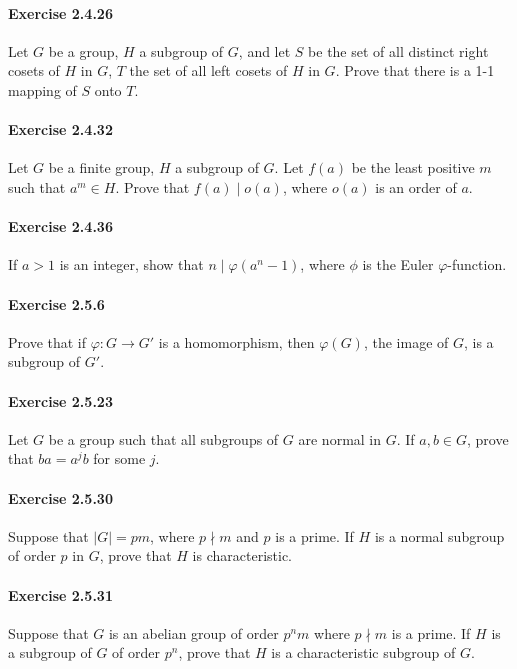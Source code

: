 \documentclass{article}
\begin{document}
\paragraph{Exercise 2.4.26} Let $G$ be a group, $H$ a subgroup of $G$, and let $S$ be the set of all distinct right cosets of $H$ in $G$, $T$ the set of all left cosets of $H$ in $G$. Prove that there is a 1-1 mapping of $S$ onto $T$.

\paragraph{Exercise 2.4.32} Let $G$ be a finite group, $H$ a subgroup of $G$. Let $f(a)$ be the least positive $m$ such that $a^m \in H$. Prove that $f(a) \mid o(a)$, where $o(a)$ is an order of $a$.

\paragraph{Exercise 2.4.36} If $a > 1$ is an integer, show that $n \mid \varphi(a^n - 1)$, where $\phi$ is the Euler $\varphi$-function.

\paragraph{Exercise 2.5.6} Prove that if $\varphi \colon G \rightarrow G'$ is a homomorphism, then $\varphi(G)$, the image of $G$, is a subgroup of $G'$.

\paragraph{Exercise 2.5.23} Let $G$ be a group such that all subgroups of $G$ are normal in $G$. If $a, b \in G$, prove that $ba = a^jb$ for some $j$.

\paragraph{Exercise 2.5.30} Suppose that $|G| = pm$, where $p \nmid m$ and $p$ is a prime. If $H$ is a normal subgroup of order $p$ in $G$, prove that $H$ is characteristic.

\paragraph{Exercise 2.5.31} Suppose that $G$ is an abelian group of order $p^nm$ where $p \nmid m$ is a prime.  If $H$ is a subgroup of $G$ of order $p^n$, prove that $H$ is a characteristic subgroup of $G$.
\end{document}
